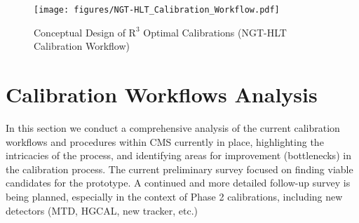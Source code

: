 
\begin{figure}[h!]	
\centering
\texttt{[image: figures/NGT-HLT\_Calibration\_Workflow.pdf]} %
\caption{Conceptual Design of $\mathrm{R}^{3}$ Optimal Calibrations (NGT-HLT Calibration Workflow)}
\label{fig:NGT-HLT_CalibrationWorkflow}
\end{figure}

\section{Calibration Workflows Analysis}
In this section we conduct a comprehensive analysis of the current calibration workflows and procedures within CMS currently in place, highlighting the intricacies of the process, and identifying areas for improvement (bottlenecks) in the calibration process. 
The current preliminary survey focused on finding viable candidates for the prototype. A continued and more detailed follow-up survey is being planned, especially in the context of Phase 2 calibrations, including new detectors (MTD, HGCAL, new tracker, etc.)

%


